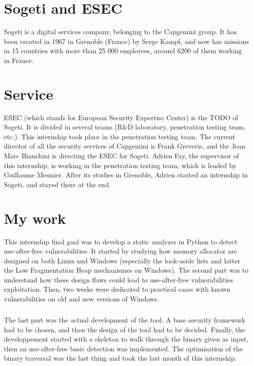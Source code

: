 \documentclass[a4paper, 12pt]{report}
\begin{document}
\section*{Sogeti and ESEC}
Sogeti is a digital services company, belonging to the Capgemini group. It has been created in 1967 in Grenoble (France) by Serge Kampf, and now has missions in 15 countries with more than 25 000 employees, around 6200 of them working in France.
\section*{Service}
ESEC (which stands for European Security Expertise Center) is the TODO of Sogeti. It is divided in several teams (R\&D laboratory, penetration testing team, etc.). This internship took place in the penetration testing team.
The current director of all the security services of Capgemini is Frank Greverie, and the Jean Marc Bianchini is directing the ESEC for Sogeti.
Adrien Fay, the supervisor of this internship, is working in the penetration testing team, which is leaded by Guillaume Meunier. After its studies in Grenoble, Adrien started an internship in Sogeti, and stayed there at the end.
\section*{My work}
This internship final goal was to develop a static analyzer in Python to detect use-after-free vulnerabilities. It started by studying how memory allocator are designed on both Linux and Windows (especially the look-aside lists and latter the Low Fragmentation Heap mechanismes on Windows). The second part was to understand how these design flaws could lead to use-after-free vulnerabilities exploitation. Then, two weeks were dedicated to practical cases with known vulnerabilities on old and new versions of Windows.\subparagraph{}
The last part was the actual development of the tool. A base security framework had to be chosen, and then the design of the tool had to be decided. Finally, the developpement started with a skeleton to walk through the binary given as input, then an use-after-free basic detection was implemented. The optimisation of the binary traversal was the last thing and took the last month of this internship.
\end{document}
